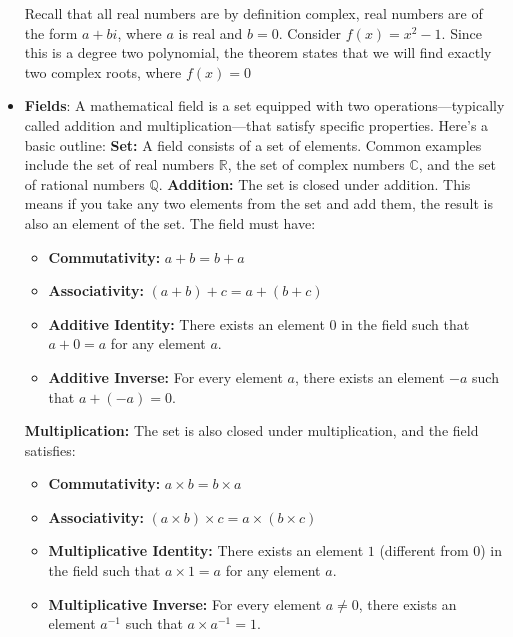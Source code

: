 \documentclass{report}
\begin{document}
\begin{itemize}
            \bigbreak \noindent 
            Recall that all real numbers are by definition complex, real numbers are of the form $a+bi$, where $a$ is real and $b=0$.
            \bigbreak \noindent 
            Consider $f(x) = x^{2} - 1$. Since this is a degree two polynomial, the theorem states that we will find exactly two complex roots, where $f(x) = 0$
        \item \textbf{Fields}:
            A mathematical field is a set equipped with two operations—typically called addition and multiplication—that satisfy specific properties. Here's a basic outline:
            \bigbreak \noindent 
            \textbf{Set:} A field consists of a set of elements. Common examples include the set of real numbers \(\mathbb{R}\), the set of complex numbers \(\mathbb{C}\), and the set of rational numbers \(\mathbb{Q}\).
            \bigbreak \noindent 
            \textbf{Addition:} The set is closed under addition. This means if you take any two elements from the set and add them, the result is also an element of the set. The field must have:
            \begin{itemize}
                \item \textbf{Commutativity:} \(a + b = b + a\)
                \item \textbf{Associativity:} \((a + b) + c = a + (b + c)\)
                \item \textbf{Additive Identity:} There exists an element \(0\) in the field such that \(a + 0 = a\) for any element \(a\).
                \item \textbf{Additive Inverse:} For every element \(a\), there exists an element \(-a\) such that \(a + (-a) = 0\).
            \end{itemize}
            \textbf{Multiplication:} The set is also closed under multiplication, and the field satisfies:
            \begin{itemize}
                \item \textbf{Commutativity:} \(a \times b = b \times a\)
                \item \textbf{Associativity:} \((a \times b) \times c = a \times (b \times c)\)
                \item \textbf{Multiplicative Identity:} There exists an element \(1\) (different from \(0\)) in the field such that \(a \times 1 = a\) for any element \(a\).
                \item \textbf{Multiplicative Inverse:} For every element \(a \neq 0\), there exists an element \(a^{-1}\) such that \(a \times a^{-1} = 1\).

\end{itemize}
\end{itemize}
\end{document}
